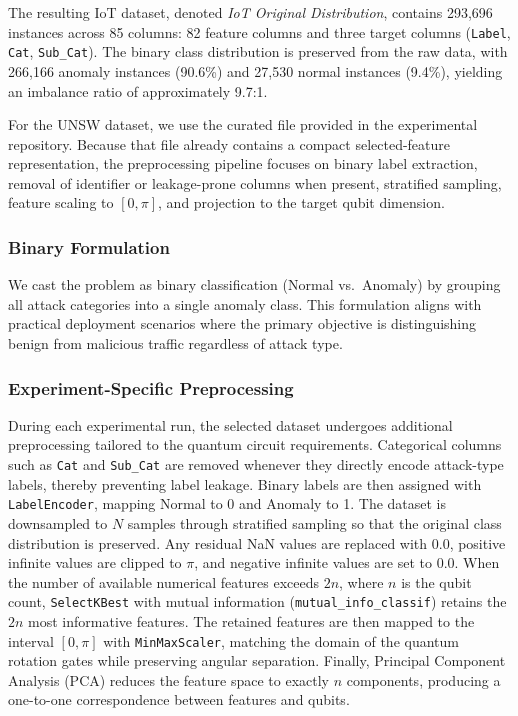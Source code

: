 \documentclass{ieeeaccess}
\begin{document}
The resulting IoT dataset, denoted \emph{IoT Original Distribution}, contains 293,696 instances across 85 columns: 82 feature columns and three target columns (\texttt{Label}, \texttt{Cat}, \texttt{Sub\_Cat}). The binary class distribution is preserved from the raw data, with 266,166 anomaly instances (90.6\%) and 27,530 normal instances (9.4\%), yielding an imbalance ratio of approximately 9.7:1.

For the UNSW dataset, we use the curated file provided in the experimental repository. Because that file already contains a compact selected-feature representation, the preprocessing pipeline focuses on binary label extraction, removal of identifier or leakage-prone columns when present, stratified sampling, feature scaling to $[0, \pi]$, and projection to the target qubit dimension.

\subsubsection{Binary Formulation}
We cast the problem as binary classification (Normal vs.\ Anomaly) by grouping all attack categories into a single anomaly class. This formulation aligns with practical deployment scenarios where the primary objective is distinguishing benign from malicious traffic regardless of attack type.

\subsubsection{Experiment-Specific Preprocessing}
During each experimental run, the selected dataset undergoes additional preprocessing tailored to the quantum circuit requirements. Categorical columns such as \texttt{Cat} and \texttt{Sub\_Cat} are removed whenever they directly encode attack-type labels, thereby preventing label leakage. Binary labels are then assigned with \texttt{LabelEncoder}, mapping Normal to 0 and Anomaly to 1. The dataset is downsampled to $N$ samples through stratified sampling so that the original class distribution is preserved. Any residual NaN values are replaced with 0.0, positive infinite values are clipped to $\pi$, and negative infinite values are set to 0.0. When the number of available numerical features exceeds $2n$, where $n$ is the qubit count, \texttt{SelectKBest} with mutual information (\texttt{mutual\_info\_classif}) retains the $2n$ most informative features. The retained features are then mapped to the interval $[0, \pi]$ with \texttt{MinMaxScaler}, matching the domain of the quantum rotation gates while preserving angular separation. Finally, Principal Component Analysis (PCA) reduces the feature space to exactly $n$ components, producing a one-to-one correspondence between features and qubits.
\end{document}
